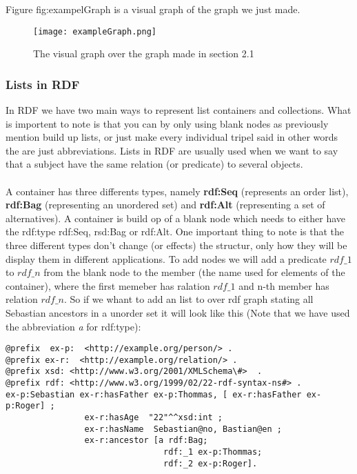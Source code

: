 Figure \refname{fig:exampelGraph} is a visual graph of the graph we just made.
\begin{figure}
    \centering
    \texttt{[image: exampleGraph.png]}
    \caption{The visual graph over the graph made in section 2.1}
    \label{fig:exampelGraph}
\end{figure}

\subsubsection{Lists in RDF}
In RDF we have two main ways to represent list containers and collections. What is importent to
note is that you can by only using blank nodes as previously mention build up lists, or just
make every individual tripel said in other words the are just abbreviations. Lists in RDF are usually
used when we want to say that a subject have the same relation (or predicate) to several objects.
\\ \\ 
A container has three differents types, namely \textbf{rdf:Seq} (represents an order list), 
\textbf{rdf:Bag} (representing an unordered set) and \textbf{rdf:Alt} (representing a set of alternatives).
A container is build op of a blank node which needs to either have the rdf:type
rdf:Seq, rsd:Bag or rdf:Alt. One important thing to note is that the three different types
don't change (or effects) the structur, only how they will be display them in different applications.
To add nodes we will add a predicate $rdf\_1$ to $rdf\_n$ from the blank node to the member (the name used for 
elements of the container), where the first memeber has ralation $rdf\_1$ and n-th member has relation $rdf\_n$.
So if we whant to add an list to over rdf graph stating all Sebastian ancestors in a unorder set 
it will look like this (Note that we have used the abbreviation \textit{a} for rdf:type):
\begin{lstlisting}[frame=single, language=turtle]
@prefix  ex-p:  <http://example.org/person/> . 
@prefix ex-r:  <http://example.org/relation/> . 
@prefix xsd: <http://www.w3.org/2001/XMLSchema\#>  . 
@prefix rdf: <http://www.w3.org/1999/02/22-rdf-syntax-ns#> .
ex-p:Sebastian ex-r:hasFather ex-p:Thommas, [ ex-r:hasFather ex-p:Roger] ; 
                ex-r:hasAge  "22"^^xsd:int ; 
                ex-r:hasName  Sebastian@no, Bastian@en ;
                ex-r:ancestor [a rdf:Bag; 
                                rdf:_1 ex-p:Thommas; 
                                rdf:_2 ex-p:Roger].
\end{lstlisting}
